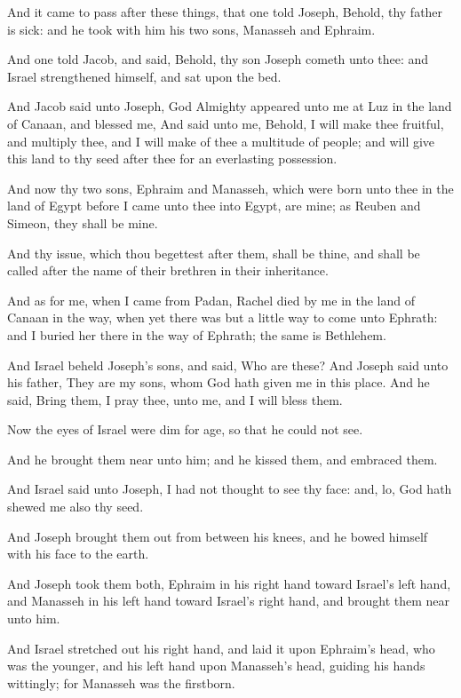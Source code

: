 \verse And it came to pass after these things, that one told Joseph,
Behold, thy father is sick: and he took with him his two sons,
Manasseh and Ephraim.

\verse And one told Jacob, and said, Behold, thy son Joseph cometh unto
thee: and Israel strengthened himself, and sat upon the bed.

\verse And Jacob said unto Joseph, God Almighty appeared unto me at Luz
in the land of Canaan, and blessed me, \verse And said unto me, Behold,
I will make thee fruitful, and multiply thee, and I will make of thee
a multitude of people; and will give this land to thy seed after thee
for an everlasting possession.

\verse And now thy two sons, Ephraim and Manasseh, which were born unto
thee in the land of Egypt before I came unto thee into Egypt, are
mine; as Reuben and Simeon, they shall be mine.

\verse And thy issue, which thou begettest after them, shall be thine,
and shall be called after the name of their brethren in their
inheritance.

\verse And as for me, when I came from Padan, Rachel died by me in the
land of Canaan in the way, when yet there was but a little way to come
unto Ephrath: and I buried her there in the way of Ephrath; the same
is Bethlehem.

\verse And Israel beheld Joseph's sons, and said, Who are these?  \verse
And Joseph said unto his father, They are my sons, whom God hath given
me in this place. And he said, Bring them, I pray thee, unto me, and I
will bless them.

\verse Now the eyes of Israel were dim for age, so that he could not
see.

And he brought them near unto him; and he kissed them, and embraced
them.

\verse And Israel said unto Joseph, I had not thought to see thy face:
and, lo, God hath shewed me also thy seed.

\verse And Joseph brought them out from between his knees, and he bowed
himself with his face to the earth.

\verse And Joseph took them both, Ephraim in his right hand toward
Israel's left hand, and Manasseh in his left hand toward Israel's
right hand, and brought them near unto him.

\verse And Israel stretched out his right hand, and laid it upon
Ephraim's head, who was the younger, and his left hand upon Manasseh's
head, guiding his hands wittingly; for Manasseh was the firstborn.

